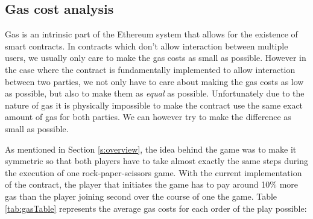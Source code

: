 \documentclass{article}
\begin{document}
    \subsection{Gas cost analysis} \label{s:gascost}
    Gas is an intrinsic part of the Ethereum system that
    allows for the existence of smart contracts. In
    contracts which don't allow interaction between multiple
    users, we usually only care to make the gas costs as
    small as possible. However in the case where the
    contract is fundamentally implemented to allow
    interaction between two parties, we not only have to
    care about making the gas costs as low as possible, but
    also to make them as {\itshape equal} as possible.
    Unfortunately due to the nature of gas it is physically
    impossible to make the contract use the same exact
    amount of gas for both parties. We can however try to
    make the difference as small as possible.
    \newline

    \noindent As mentioned in Section \ref{s:overview}, the
    idea behind the game was to make it symmetric so that
    both players have to take almost exactly the same steps
    during the execution of one rock-paper-scissors game.
    With the current implementation of the contract, the
    player that initiates the game has to pay around 10\%
    more gas than the player joining second over the course
    of one the game. Table \ref{tab:gasTable} represents the
    average gas costs for each order of the play possible:
    \newline
\end{document}
